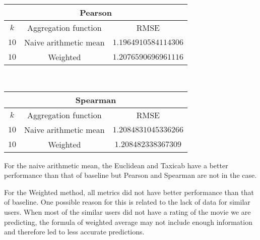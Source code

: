 \documentclass[final]{cvpr}
\begin{document}
\hspace{2em}

\begin{tabular}{| c | c | c |}
    \hline
    \multicolumn{3}{|c|}{\textbf{Pearson}}\\
    \hline
    $k$ & Aggregation function & RMSE\\
    \hline
    $10$ & Naive arithmetic mean & $1.1964910584114306$\\
    \hline
    $10$ & Weighted & $1.2076590696961116$\\
    \hline
\end{tabular}\\

\hspace{2em}

\begin{tabular}{| c | c | c |}
    \hline
    \multicolumn{3}{|c|}{\textbf{Spearman}}\\
    \hline
    $k$ & Aggregation function & RMSE\\
    \hline
    $10$ & Naive arithmetic mean & $1.2084831045336266$\\
    \hline
    $10$ & Weighted & $1.208482338367309$\\
    \hline
\end{tabular}

\hspace{10em}

For the naive arithmetic mean, the Euclidean and Taxicab have a better performance than that of baseline but Pearson and Spearman are not in the case.

For the Weighted method, all metrics did not have better performance than that of baseline. One possible reason for this is related to the lack of data for similar users. When most of the similar users did not have a rating of the movie we are predicting, the formula of weighted average may not include enough information and therefore led to less accurate predictions.
      
{\small
	
	
}
\end{document}
